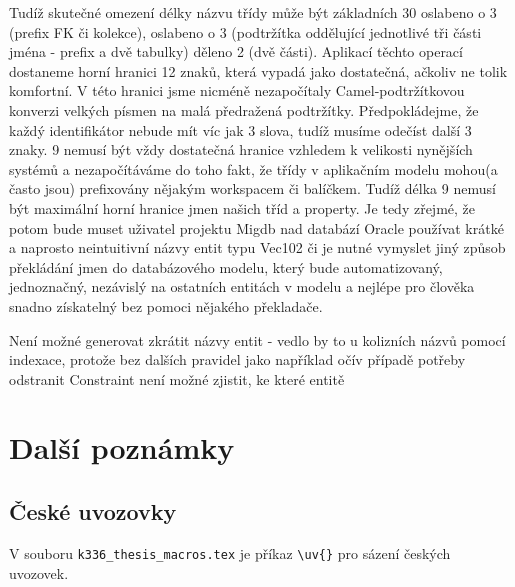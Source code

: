 \documentclass[11pt,twoside,a4paper]{book}
\begin{document}
Tudíž skutečné omezení délky názvu třídy může být základních 30 oslabeno o 3
(prefix FK či kolekce), oslabeno o 3 (podtržítka oddělující jednotlivé tři
části jména - prefix a dvě tabulky) děleno 2 (dvě části). Aplikací těchto
operací dostaneme horní hranici 12 znaků, která vypadá jako dostatečná, ačkoliv 
ne tolik komfortní. V této hranici jsme nicméně nezapočítaly Camel-podtržítkovou
konverzi velkých písmen na malá předražená podtržítky. Předpokládejme, že každý
identifikátor nebude mít víc jak 3 slova, tudíž musíme odečíst další 3 znaky. 9
nemusí být vždy dostatečná hranice vzhledem k velikosti nynějších systémů a
nezapočítáváme do toho fakt, že třídy v aplikačním modelu mohou(a často jsou)
prefixovány nějakým workspacem či balíčkem. Tudíž délka 9 nemusí být maximální
horní hranice jmen našich tříd a property. Je tedy zřejmé, že potom bude muset
uživatel projektu Migdb nad databází Oracle používat krátké a naprosto
neintuitivní názvy entit typu Vec102 či je nutné vymyslet jiný způsob překládání
jmen do databázového modelu, který bude automatizovaný, jednoznačný, nezávislý
na ostatních entitách v modelu a nejlépe pro člověka snadno získatelný bez
pomoci nějakého překladače.

Není možné generovat zkrátit názvy entit - vedlo by to u kolizních názvů pomocí
indexace, protože bez dalších pravidel jako například očív případě potřeby
odstranit Constraint není možné zjistit, ke které entitě

\section{Další poznámky}
\subsection{České uvozovky}
V souboru \verb|k336_thesis_macros.tex| je příkaz \verb|\uv{}| pro sázení českých uvozovek. 

\end{document}
